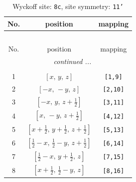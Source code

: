 \documentclass[fleqn,8pt]{jsarticle}
\begin{document}
\renewcommand{\arraystretch}{1.2}
\begin{longtable}{ccc}
\caption{Wyckoff site: {\tt 8c}, site symmetry: {\tt 11'}}
 \\
 \hline \hline
No. & position & mapping \\ \hline \endfirsthead

\multicolumn{2}{l}{\tablename\ \thetable{}} \\
 \hline \hline
No. & position & mapping \\ \hline \endhead

 \hline \hline
\multicolumn{2}{r}{\footnotesize\it continued ...} \\ \endfoot

 \hline \hline
\multicolumn{2}{r}{} \\ \endlastfoot

1 & $\left[ x,\, y,\, z \right]$ & {\tt [1,9]} \\ \hline
2 & $\left[ - x,\, - y,\, z \right]$ & {\tt [2,10]} \\ \hline
3 & $\left[ - x,\, y,\, z + \frac{1}{2} \right]$ & {\tt [3,11]} \\ \hline
4 & $\left[ x,\, - y,\, z + \frac{1}{2} \right]$ & {\tt [4,12]} \\ \hline
5 & $\left[ x + \frac{1}{2},\, y + \frac{1}{2},\, z + \frac{1}{2} \right]$ & {\tt [5,13]} \\ \hline
6 & $\left[ \frac{1}{2} - x,\, \frac{1}{2} - y,\, z + \frac{1}{2} \right]$ & {\tt [6,14]} \\ \hline
7 & $\left[ \frac{1}{2} - x,\, y + \frac{1}{2},\, z \right]$ & {\tt [7,15]} \\ \hline
8 & $\left[ x + \frac{1}{2},\, \frac{1}{2} - y,\, z \right]$ & {\tt [8,16]} \\
\end{longtable}
\end{document}
